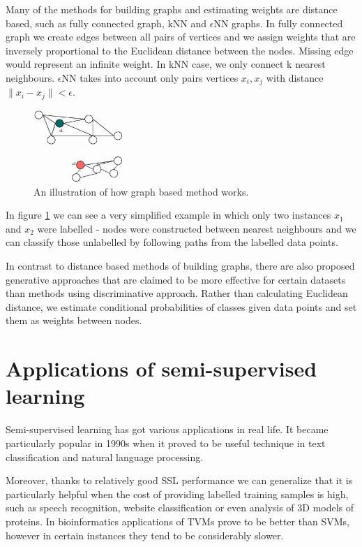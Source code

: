 \documentclass[12pt, a4paper, pdflatex]{report}
\begin{document}
Many of the methods for building graphs and estimating weights are distance based, such as fully connected graph, kNN and $\epsilon$NN graphs\cite{Zhu06semi}. In fully connected graph we create edges between all pairs of vertices and we assign weights that are inversely proportional to the Euclidean distance between the nodes. Missing edge would represent an infinite weight\cite{chapelle06}. In kNN case, we only connect k nearest neighbours. $\epsilon$NN takes into account only pairs vertices $ x_i, x_j $ with distance $ \| x_i - x_j \| < \epsilon $.

\begin{figure}[htbp]
\centering
\includegraphics[width=0.3\textwidth]{graphics/graph-methods.jpg}
\caption{ An illustration of how graph based method works.\label{fig:GraphMethodFig}}
\end{figure}

In figure \ref{fig:GraphMethodFig} we can see a very simplified example in which only two instances $x_1$ and $x_2$ were labelled - nodes were constructed between nearest neighbours and we can classify those unlabelled by following paths from the labelled data points.

In contrast to distance based methods of building graphs, there are also proposed generative approaches that are claimed to be more effective for certain datasets than methods using discriminative approach\cite{He07}. Rather than calculating Euclidean distance, we estimate conditional probabilities of classes given data points and set them as weights between nodes.

\section{Applications of semi-supervised learning}

Semi-supervised learning has got various applications in real life. It became particularly popular in 1990s when it proved to be useful technique in text classification and natural language processing\cite{chapelle06}. 

Moreover, thanks to relatively good SSL performance we can generalize that it is particularly helpful when the cost of providing labelled training samples is high, such as speech recognition, website classification or even analysis of 3D models of proteins. In bioinformatics applications of TVMs prove to be better than SVMs, however in certain instances they tend to be considerably slower\cite{chapelle06}.
 
\end{document}
